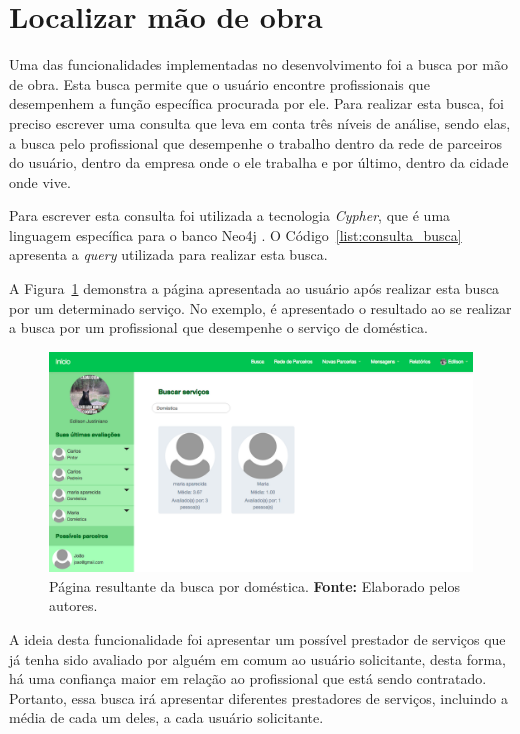 \section{Localizar mão de obra}

\par Uma das funcionalidades implementadas no desenvolvimento foi a busca por mão de obra. Esta busca permite que o usuário encontre profissionais que desempenhem a função específica procurada por ele. Para realizar esta busca, foi preciso escrever uma consulta que leva em conta três níveis de análise, sendo elas, a busca pelo profissional que desempenhe o trabalho dentro da rede de parceiros do usuário, dentro da empresa onde o ele trabalha e por último, dentro da cidade onde vive.  

\par Para escrever esta consulta foi utilizada a tecnologia \textit{Cypher}, que é uma linguagem específica para o banco Neo4j \cite{neo4j_team_manual}. O Código~\ref{list:consulta_busca} apresenta a \textit{query} utilizada para realizar esta busca.

\par A Figura~\ref{fig:busca_domestica_edilson} demonstra a página apresentada ao usuário após realizar esta busca por um determinado serviço. No exemplo, é apresentado o resultado ao se realizar a busca por um profissional que desempenhe o serviço de doméstica.

\newpage
\begin{figure}[h!]
	\centerline{\includegraphics[scale=0.3]{./imagens/busca-domestica-edilson.png}}
	\caption[Página resultante da busca por doméstica.]
	{Página resultante da busca por doméstica. \textbf{Fonte:} Elaborado pelos autores.}
	\label{fig:busca_domestica_edilson}
\end{figure}

\par A ideia desta funcionalidade foi apresentar um possível prestador de serviços que já tenha sido avaliado por alguém em comum ao usuário solicitante, desta forma, há uma confiança maior em relação ao profissional que está sendo contratado. Portanto, essa busca irá apresentar diferentes prestadores de serviços, incluindo a média de cada um deles, a cada usuário solicitante.

